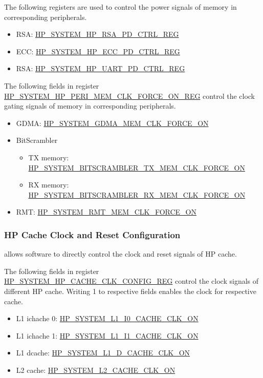 \documentclass[main\_\_EN.tex]{subfiles}
\begin{document}
The following registers are used to control the power signals of memory in corresponding peripherals.
\begin{itemize}
    \item RSA: \hyperref[regdesc:HPSYSTEMHPRSAPDCTRLREG]{HP\_SYSTEM\_HP\_RSA\_PD\_CTRL\_REG}
    \item ECC: \hyperref[regdesc:HPSYSTEMHPECCPDCTRLREG]{HP\_SYSTEM\_HP\_ECC\_PD\_CTRL\_REG}
    \item RSA: \hyperref[regdesc:HPSYSTEMHPUARTPDCTRLREG]{HP\_SYSTEM\_HP\_UART\_PD\_CTRL\_REG}
\end{itemize}

The following fields in register \hyperref[regdesc:HPSYSTEMHPPERIMEMCLKFORCEONREG]{HP\_SYSTEM\_HP\_PERI\_MEM\_CLK\_FORCE\_ON\_REG} control the clock gating signals of memory in corresponding peripherals.
\begin{itemize}
    \item GDMA: \hyperref[fielddesc:HPSYSTEMGDMAMEMCLKFORCEON]{HP\_SYSTEM\_GDMA\_MEM\_CLK\_FORCE\_ON}
    \item BitScrambler
    \begin{itemize}
        \item TX memory: \hyperref[fielddesc:HPSYSTEMBITSCRAMBLERTXMEMCLKFORCEON]{HP\_SYSTEM\_BITSCRAMBLER\_TX\_MEM\_CLK\_FORCE\_ON}
        \item RX memory: \hyperref[fielddesc:HPSYSTEMBITSCRAMBLERRXMEMCLKFORCEON]{HP\_SYSTEM\_BITSCRAMBLER\_RX\_MEM\_CLK\_FORCE\_ON}
    \end{itemize}
    \item RMT: \hyperref[fielddesc:HPSYSTEMRMTMEMCLKFORCEON]{HP\_SYSTEM\_RMT\_MEM\_CLK\_FORCE\_ON}
\end{itemize}

\subsubsection{HP Cache Clock and Reset Configuration}

\chipname{} allows software to directly control the clock and reset signals of HP cache.

The following fields in register \hyperref[regdesc:HPSYSTEMHPCACHECLKCONFIGREG]{HP\_SYSTEM\_HP\_CACHE\_CLK\_CONFIG\_REG} control the clock signals of different HP cache. Writing 1 to respective fields enables the clock for respective cache.
\begin{itemize}
    \item L1 ichache 0: \hyperref[fielddesc:HPSYSTEML1I0CACHECLKON]{HP\_SYSTEM\_L1\_I0\_CACHE\_CLK\_ON}
    \item L1 ichache 1: \hyperref[fielddesc:HPSYSTEML1I1CACHECLKON]{HP\_SYSTEM\_L1\_I1\_CACHE\_CLK\_ON}
    \item L1 dcache: \hyperref[fielddesc:HPSYSTEML1DCACHECLKON]{HP\_SYSTEM\_L1\_D\_CACHE\_CLK\_ON}
    \item L2 cache: \hyperref[fielddesc:HPSYSTEML2CACHECLKON]{HP\_SYSTEM\_L2\_CACHE\_CLK\_ON}
\end{itemize}
\end{document}

